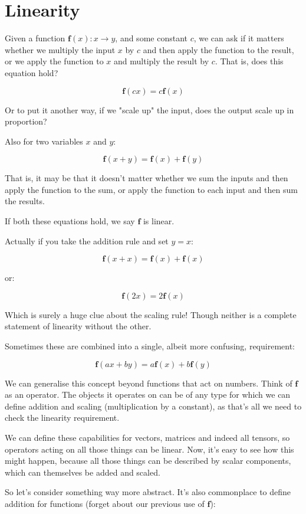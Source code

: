 \chapter{Linearity}

Given a function $\mathbf{f}(x) \colon x \to y$, and some constant $c$, we can ask if it matters whether we multiply the input $x$ by $c$ and then apply the function to the result, or we apply the function to $x$ and multiply the result by $c$. That is, does this equation hold?

$$\mathbf{f}(cx) = c\mathbf{f}(x)$$

Or to put it another way, if we "scale up" the input, does the output scale up in proportion?

Also for two variables $x$ and $y$:

$$\mathbf{f}(x + y) = \mathbf{f}(x) + \mathbf{f}(y)$$

That is, it may be that it doesn't matter whether we sum the inputs and then apply the function to the sum, or apply the function to each input and then sum the results.

If both these equations hold, we say $\mathbf{f}$ is linear.

Actually if you take the addition rule and set $y = x$:

$$\mathbf{f}(x + x) = \mathbf{f}(x) + \mathbf{f}(x)$$

or:

$$\mathbf{f}(2x) = 2\mathbf{f}(x)$$

Which is surely a huge clue about the scaling rule! Though neither is a complete statement of linearity without the other.

Sometimes these are combined into a single, albeit more confusing, requirement:

$$\mathbf{f}(ax + by) = a\mathbf{f}(x) + b\mathbf{f}(y)$$

We can generalise this concept beyond functions that act on numbers. Think of $\mathbf{f}$ as an operator. The objects it operates on can be of any type for which we can define addition and scaling (multiplication by a constant), as that's all we need to check the linearity requirement.

We can define these capabilities for vectors, matrices and indeed all tensors, so operators acting on all those things can be linear. Now, it's easy to see how this might happen, because all those things can be described by scalar components, which can themselves be added and scaled.

So let's consider something way more abstract. It's also commonplace to define addition for functions (forget about our previous use of $\mathbf{f}$):

